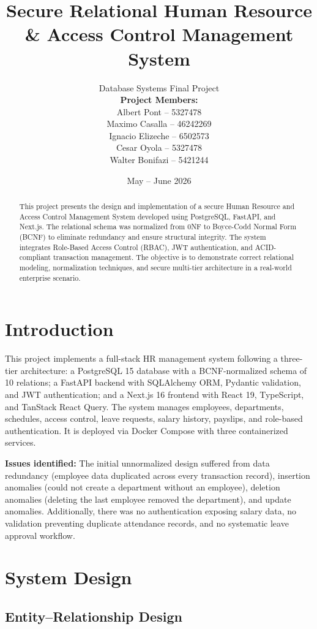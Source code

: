 \documentclass[twocolumn,12pt]{article}
\title{\textbf{Secure Relational Human Resource \& Access Control Management System}}
\author{
Database Systems Final Project \\[6pt]
\textbf{Project Members:} \\[4pt]
Albert Pont -- 5327478 \\
Maximo Casalla -- 46242269 \\
Ignacio Elizeche -- 6502573 \\
Cesar Oyola -- 5327478 \\
Walter Bonifazi -- 5421244
}
\date{May -- June 2026}
\begin{document}
\maketitle

\begin{abstract}
This project presents the design and implementation of a secure Human Resource and Access Control Management System developed using PostgreSQL, FastAPI, and Next.js. The relational schema was normalized from 0NF to Boyce-Codd Normal Form (BCNF) to eliminate redundancy and ensure structural integrity. The system integrates Role-Based Access Control (RBAC), JWT authentication, and ACID-compliant transaction management. The objective is to demonstrate correct relational modeling, normalization techniques, and secure multi-tier architecture in a real-world enterprise scenario.
\end{abstract}

\section{Introduction}

This project implements a full-stack HR management system following a three-tier architecture: a PostgreSQL 15 database with a BCNF-normalized schema of 10 relations; a FastAPI backend with SQLAlchemy ORM, Pydantic validation, and JWT authentication; and a Next.js 16 frontend with React 19, TypeScript, and TanStack React Query. The system manages employees, departments, schedules, access control, leave requests, salary history, payslips, and role-based authentication. It is deployed via Docker Compose with three containerized services.

\textbf{Issues identified:} The initial unnormalized design suffered from data redundancy (employee data duplicated across every transaction record), insertion anomalies (could not create a department without an employee), deletion anomalies (deleting the last employee removed the department), and update anomalies. Additionally, there was no authentication exposing salary data, no validation preventing duplicate attendance records, and no systematic leave approval workflow.

\section{System Design}

\subsection{Entity--Relationship Design}
\end{document}
